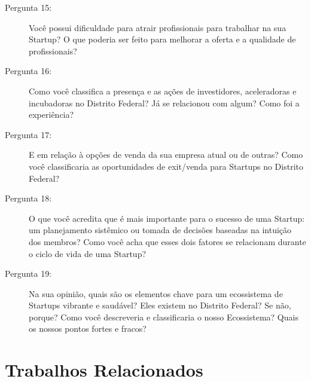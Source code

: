 \begin{description}
  \item [Pergunta 15:] Você possui dificuldade para atrair profissionais para trabalhar na sua Startup? O que poderia ser feito para melhorar a oferta e a qualidade de profissionais?

  \item [Pergunta 16:] Como você classifica a presença e as ações de investidores, aceleradoras e incubadoras no Distrito Federal? Já se relacionou com algum? Como foi a experiência?

  \item [Pergunta 17:] E em relação à opções de venda da sua empresa atual ou de outras? Como você classificaria as oportunidades de exit/venda para Startups no Distrito Federal?

  \item [Pergunta 18:] O que você acredita que é mais importante para o sucesso de uma Startup: um planejamento sistêmico ou tomada de decisões baseadas na intuição dos membros? Como você acha que esses dois fatores se relacionam durante o ciclo de vida de uma Startup? 
  
  \item [Pergunta 19:] Na sua opinião, quais são os elementos chave para um ecossistema de Startups vibrante e saudável? Eles existem no Distrito Federal? Se não, porque? Como você descreveria e classificaria o nosso Ecossistema? Quais os nossos pontos fortes e fracos?
\end{description}

\section{Trabalhos Relacionados}
\label{section:trabalhos_relacionados}

